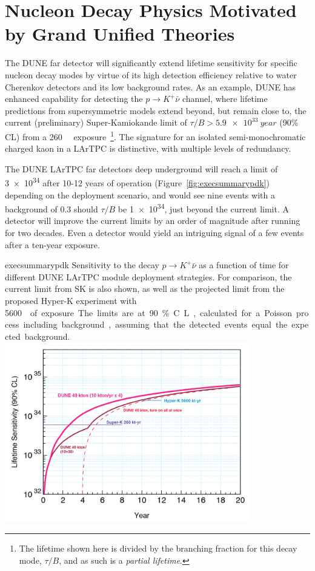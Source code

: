 \section{Nucleon Decay Physics Motivated by Grand Unified Theories}


The DUNE far detector will significantly extend lifetime sensitivity
for specific nucleon decay modes by virtue of its high detection
efficiency relative to water Cherenkov detectors and its low
background rates.  As an example, DUNE has enhanced capability for
detecting the $p\to K^+\bar{\nu}$ channel, where lifetime
predictions from supersymmetric models extend beyond, but remain close
to, the current (preliminary) Super-Kamiokande limit of $\tau/B >
\SI{5.9e33}{year}$ (90\% CL) from a \SI[number-unit-product = -,
inter-unit-product=\ensuremath{{}\cdot{}}]{260}{\kt\year}
exposure~\cite{kearns_isoups}\footnote{The lifetime shown here is
  divided by the branching fraction for this decay mode, $\tau/B$, and
  as such is a \emph{partial lifetime}.}.  The signature for an
isolated semi-monochromatic charged kaon in a LArTPC is distinctive,
with multiple levels of redundancy. 

The DUNE LArTPC far detectors deep underground will reach a limit of
\SI{3e34}{\year} after 10-12 years of operation
(Figure~\ref{fig:execsummarypdk}) depending on the deployment
scenario, and would see nine events with a background of 0.3 should
$\tau/B$ be \SI{1e34}{\year}, just beyond the current limit. A
 detector will improve the current limits by an order of
magnitude after running for two decades. Even a  detector
would yield an intriguing signal of a few events after a ten-year
exposure.


\begin{cdrfigure}{execsummarypdk} {Sensitivity to the
    decay $p\to K^+ \bar{\nu}$ as a function of time for different DUNE 
LArTPC module deployment strategies. 
  For comparison, the current limit from SK is also shown, as well as the projected limit from the proposed Hyper-K experiment with \SI{5600}\ktyr{} of exposure.
  The limits are at 90\% C.L., calculated for
  a Poisson process including background, assuming that the detected events
  equal the expected background.}
\includegraphics[width=0.8\textwidth]{volume-physics/figures/lar4x10.png}
\end{cdrfigure}


